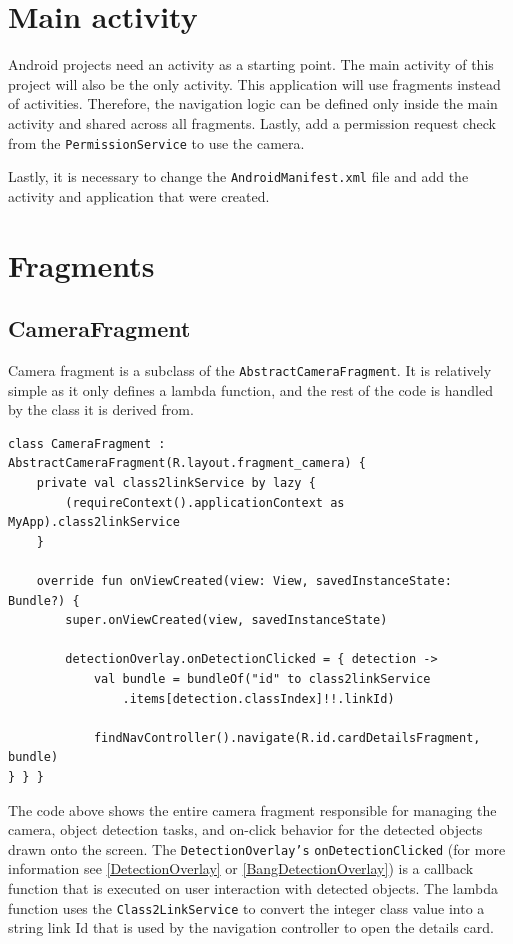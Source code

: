 \section{Main activity}
Android projects need an activity as a starting point. The main activity of this project will also be the only activity. This application will use fragments instead of activities. Therefore, the navigation logic can be defined only inside the main activity and shared across all fragments. Lastly, add a permission request check from the \texttt{PermissionService} to use the camera.

Lastly, it is necessary to change the \texttt{AndroidManifest.xml} file and add the activity and application that were created.




\section{Fragments}

\subsection{CameraFragment}
Camera fragment is a subclass of the \texttt{AbstractCameraFragment}. It is relatively simple as it only defines a lambda function, and the rest of the code is handled by the class it is derived from.

\begin{verbatim}
class CameraFragment : AbstractCameraFragment(R.layout.fragment_camera) {
    private val class2linkService by lazy {
        (requireContext().applicationContext as MyApp).class2linkService
    }

    override fun onViewCreated(view: View, savedInstanceState: Bundle?) {
        super.onViewCreated(view, savedInstanceState)
        
        detectionOverlay.onDetectionClicked = { detection ->
            val bundle = bundleOf("id" to class2linkService
                .items[detection.classIndex]!!.linkId)
                
            findNavController().navigate(R.id.cardDetailsFragment, bundle)
} } }
\end{verbatim}

The code above shows the entire camera fragment responsible for managing the camera, object detection tasks, and on-click behavior for the detected objects drawn onto the screen. The \texttt{DetectionOverlay's} \texttt{onDetectionClicked} (for more information see \ref{DetectionOverlay} or \ref{BangDetectionOverlay}) is a callback function that is executed on user interaction with detected objects. The lambda function uses the \texttt{Class2LinkService} to convert the integer class value into a string link Id that is used by the navigation controller to open the details card.

